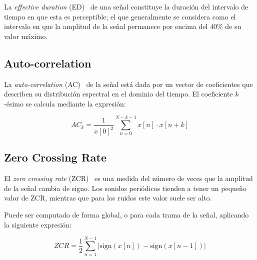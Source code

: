 La \textit{effective duration} (ED)~\cite{Peters04} de una señal constituye la duración del intervalo de tiempo en que esta es perceptible;
el que generalmente se considera como el intervalo en que la amplitud de la señal permanece por encima del 40\% de su valor máximo.

\subsection{Auto-correlation}\label{subsec:auto-correlation}

La \textit{auto-correlation} (AC)~\cite{Peters04,Gunasekaran11} de la señal está dada por un vector de coeficientes que describen su distribución espectral en el dominio del tiempo.
El coeficiente $k$-ésimo se calcula mediante la expresión:

\begin{equation}
    \label{eq:AC}
    AC_k = \frac{1}{x[0]^2}\sum_{n=0}^{N-k-1}{x[n]\cdot x[n+k]}
\end{equation}

\subsection{Zero Crossing Rate}\label{subsec:zeroCrossingRate}

El \textit{zero crossing rate} (ZCR)~\cite{Peters04,Fagerlund07,Gunasekaran11} es una medida del número de veces que la amplitud de la señal cambia de signo.
Los sonidos periódicos tienden a tener un pequeño valor de ZCR, mientras que para los ruidos este valor suele ser alto.

Puede ser computado de forma global, o para cada trama de la señal, aplicando la siguiente expresión:

\begin{equation}
    \label{eq:ZCR}
    ZCR = \frac{1}{2}\sum_{n=1}^{N-1}{|\text{sign}(x[n]) - \text{sign}(x[n-1])|}
\end{equation}
